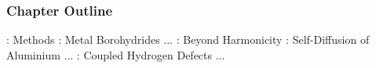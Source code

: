 \subsubsection{Chapter Outline}
\label{sec:chapters}

: Methods
: Metal Borohydrides ...
: Beyond Harmonicity
: Self-Diffusion of Aluminium ...
: Coupled Hydrogen Defects ...

